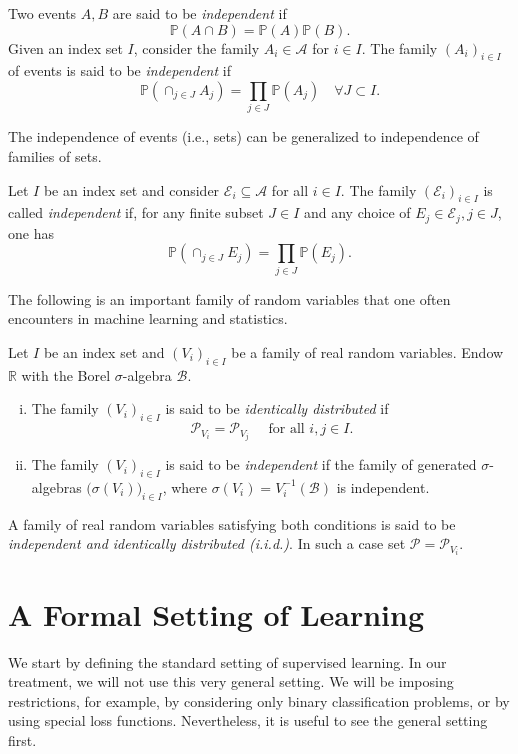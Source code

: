 \begin{definition}
Two events $A,B$ are said to be \emph{independent} if $$\mathbb{P}(A \cap B) = \mathbb{P}(A)\mathbb{P}(B).$$ Given 
an index set $I$, consider the family $A_i \in \mathcal{A}$ for $i \in I$. The
family $(A_i)_{i\in I}$ of events is said to be \emph{independent}
if $$\mathbb{P}(\cap_{j \in J} A_j) = \prod_{j \in J} \mathbb{P}(A_j) \quad \forall J \subset I.$$	
\end{definition}

The independence of events (i.e., sets) can be generalized to independence of
families of sets. 
\begin{definition}
        Let $I$ be an index set and consider $\mathcal{E}_i \subseteq \mathcal{A}$ for all $i \in I$.
        The family $(\mathcal{E}_i)_{i \in I}$ is called \emph{independent} if, for any finite subset 
        $J \in I$ and any choice of $E_j \in \mathcal{E}_j, j \in J$, one has 
        $$
        \mathbb{P}(\cap_{j \in J} E_j) = \prod_{j \in J} \mathbb{P}(E_j).
        $$
\end{definition}
The following is an important family of random variables that one often encounters 
in machine learning and statistics. 
\begin{definition}
	\label{def:iid}
	Let $I$ be an index set and $(V_i)_{i \in I}$ be a family of real random 
	variables. Endow $\mathbb{R}$ with the Borel $\sigma$-algebra $\mathcal{B}$.
	\begin{enumerate}[(i)]
		\item The family $(V_i)_{i \in I}$ is said to be \emph{identically distributed} if 
		$$\mathcal{P}_{V_i} = \mathcal{P}_{V_j} \quad \text{ for all } i, j \in I.$$
		\item The family $(V_i)_{i \in I}$ is said to be \emph{independent} if the 
		family of generated $\sigma$-algebras $\bigl(\sigma(V_i) \bigr)_{i\in I}$, where 
		$\sigma(V_i) = V_i^{-1}(\mathcal{B})$ is independent.
	\end{enumerate}
A family of real random variables satisfying both conditions is said to be
\emph{independent and identically distributed (i.i.d.)}.
In such a case set $\mathcal{P} = \mathcal{P}_{V_i}$. \end{definition}

\section{A Formal Setting of Learning}
\label{sec:formal_learning}
We start by defining the standard setting of supervised learning. In our
treatment, we will not use this very general setting. We will be imposing restrictions, for
example, by considering only binary classification problems, or by using special
loss functions. Nevertheless, it is useful to see the general setting first.

